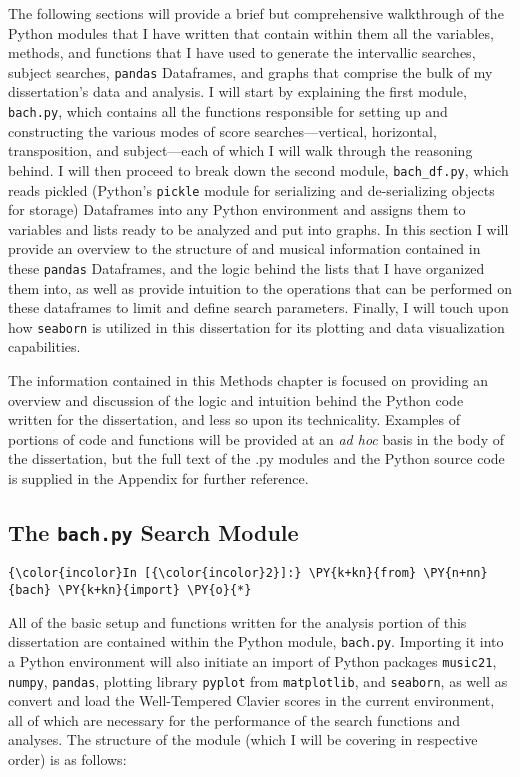 The following sections will provide a brief but comprehensive
walkthrough of the Python modules that I have written that contain
within them all the variables, methods, and functions that I have used
to generate the intervallic searches, subject searches, \texttt{pandas}
Dataframes, and graphs that comprise the bulk of my dissertation's data
and analysis. I will start by explaining the first module,
\texttt{bach.py}, which contains all the functions responsible for
setting up and constructing the various modes of score
searches---vertical, horizontal, transposition, and
subject---each of which I will walk through the reasoning behind. I
will then proceed to break down the second module, \texttt{bach\_df.py},
which reads pickled (Python's \texttt{pickle} module for serializing and
de-serializing objects for storage) Dataframes into any Python
environment and assigns them to variables and lists ready to be analyzed
and put into graphs. In this section I will provide an overview to the
structure of and musical information contained in these \texttt{pandas}
Dataframes, and the logic behind the lists that I have organized them
into, as well as provide intuition to the operations that can be
performed on these dataframes to limit and define search parameters.
Finally, I will touch upon how \texttt{seaborn} is utilized in this
dissertation for its plotting and data visualization capabilities.

The information contained in this Methods chapter is focused on
providing an overview and discussion of the logic and intuition behind
the Python code written for the dissertation, and less so upon its
technicality. Examples of portions of code and functions will be
provided at an \emph{ad hoc} basis in the body of the dissertation, but
the full text of the .py modules and the Python source code is supplied
in the Appendix for further reference.

    \subsection{\texorpdfstring{The \texttt{bach.py} Search
Module}{The bach.py Search Module}}\label{the-bach.py-search-module}

    \begin{Verbatim}[commandchars=\\\{\}]
{\color{incolor}In [{\color{incolor}2}]:} \PY{k+kn}{from} \PY{n+nn}{bach} \PY{k+kn}{import} \PY{o}{*}
\end{Verbatim}

    All of the basic setup and functions written for the analysis portion of
this dissertation are contained within the Python module,
\texttt{bach.py}. Importing it into a Python environment will also
initiate an import of Python packages \texttt{music21}, \texttt{numpy},
\texttt{pandas}, plotting library \texttt{pyplot} from
\texttt{matplotlib}, and \texttt{seaborn}, as well as convert and load
the Well-Tempered Clavier scores in the current environment, all of
which are necessary for the performance of the search functions and
analyses. The structure of the module (which I will be covering in
respective order) is as follows:

